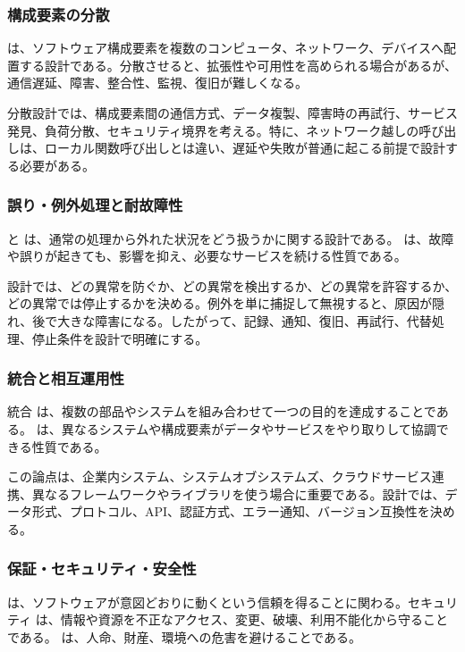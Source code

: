 \subsubsection{構成要素の分散}

 は、ソフトウェア構成要素を複数のコンピュータ、ネットワーク、デバイスへ配置する設計である。分散させると、拡張性や可用性を高められる場合があるが、通信遅延、障害、整合性、監視、復旧が難しくなる。

分散設計では、構成要素間の通信方式、データ複製、障害時の再試行、サービス発見、負荷分散、セキュリティ境界を考える。特に、ネットワーク越しの呼び出しは、ローカル関数呼び出しとは違い、遅延や失敗が普通に起こる前提で設計する必要がある。

\subsubsection{誤り・例外処理と耐故障性}

 と は、通常の処理から外れた状況をどう扱うかに関する設計である。 は、故障や誤りが起きても、影響を抑え、必要なサービスを続ける性質である。

設計では、どの異常を防ぐか、どの異常を検出するか、どの異常を許容するか、どの異常では停止するかを決める。例外を単に捕捉して無視すると、原因が隠れ、後で大きな障害になる。したがって、記録、通知、復旧、再試行、代替処理、停止条件を設計で明確にする。

\subsubsection{統合と相互運用性}

統合 は、複数の部品やシステムを組み合わせて一つの目的を達成することである。 は、異なるシステムや構成要素がデータやサービスをやり取りして協調できる性質である。

この論点は、企業内システム、システムオブシステムズ、クラウドサービス連携、異なるフレームワークやライブラリを使う場合に重要である。設計では、データ形式、プロトコル、API、認証方式、エラー通知、バージョン互換性を決める。

\subsubsection{保証・セキュリティ・安全性}

 は、ソフトウェアが意図どおりに動くという信頼を得ることに関わる。セキュリティ は、情報や資源を不正なアクセス、変更、破壊、利用不能化から守ることである。 は、人命、財産、環境への危害を避けることである。

